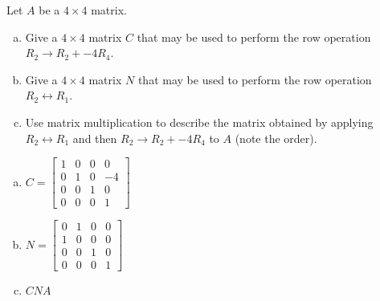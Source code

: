
\begin{exerciseStatement}


Let \(A\) be a \(4 \times 4\) matrix.


\begin{enumerate}[(a)]
\item Give a \(4 \times 4\) matrix \(C\) that may be used to perform the row operation \( R_2 \to R_2 + -4R_4 \).
\item Give a \(4 \times 4\) matrix \(N\) that may be used to perform the row operation \( R_2 \leftrightarrow R_1 \).
\item Use matrix multiplication to describe the matrix obtained by applying \( R_2 \leftrightarrow R_1 \) and then \( R_2 \to R_2 + -4R_4 \) to \(A\) (note the order). 
\end{enumerate}
    
\end{exerciseStatement}
    
\begin{exerciseAnswer} 

\begin{enumerate}[(a)]
\item \(C= \left[\begin{array}{cccc}
1 & 0 & 0 & 0 \\
0 & 1 & 0 & -4 \\
0 & 0 & 1 & 0 \\
0 & 0 & 0 & 1
\end{array}\right] \)
\item \(N= \left[\begin{array}{cccc}
0 & 1 & 0 & 0 \\
1 & 0 & 0 & 0 \\
0 & 0 & 1 & 0 \\
0 & 0 & 0 & 1
\end{array}\right] \)
\item \(CNA\)
\end{enumerate}
    
\end{exerciseAnswer}
    
